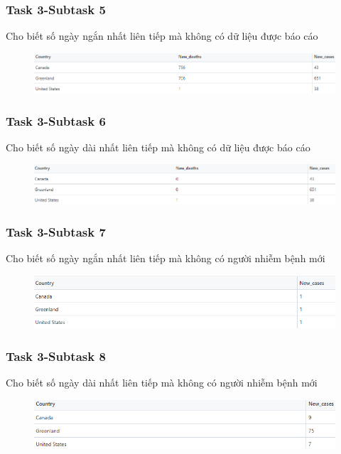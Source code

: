 \documentclass[english,10pt,table]{beamer}
\begin{document}
\frame
{
    \frametitle{Task 3-Subtask 5}
    \begin{block}{Cho biết số ngày ngắn nhất liên tiếp mà không có dữ liệu được báo cáo}
    \begin{figure}[H]
		\centering
		\includegraphics[scale=0.4]{images/3.5.png}
	\end{figure}
    \end{block}
}
\frame
{
    \frametitle{Task 3-Subtask 6}
    \begin{block}{Cho biết số ngày dài nhất liên tiếp mà không có dữ liệu được báo cáo}
    \begin{figure}[H]
		\centering
		\includegraphics[scale=0.4]{images/3.6.png}
	\end{figure}
    \end{block}
}
\frame
{
    \frametitle{Task 3-Subtask 7}
    \begin{block}{Cho biết số ngày ngắn nhất liên tiếp mà không có người nhiễm bệnh mới}
    \begin{figure}[H]
		\centering
		\includegraphics[scale=0.5]{images/3.7.png}
	\end{figure}
    \end{block}
}
\frame
{
    \frametitle{Task 3-Subtask 8}
    \begin{block}{Cho biết số ngày dài nhất liên tiếp mà không có người nhiễm bệnh mới}
    \begin{figure}[H]
		\centering
		\includegraphics[scale=0.5]{images/3.8.png}
	\end{figure}
    \end{block}
}
\end{document}
